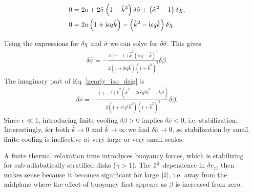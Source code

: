 \begin{align}
  0 &= 2a + 2\hat{\sigma}\left(1+\hat{k}^2\right)\delta\hat{\sigma} +
  \left(\hat{\sigma}^2 -1\right)\delta\chi,\notag\\
  0&= 2a\left(1+\mathrm{i}\epsilon q \hat{k}\right) - \left(\hat{k}^2 - \mathrm{i}\epsilon
    q \hat{k}\right)\delta\chi.
\end{align} 

Using the expressions for $\delta\chi$ and $\hat{\sigma}$ we can solve
for $\delta\hat{\sigma}$. This gives 
\begin{align}\label{nearly_iso_dsig}
  \delta \hat{\sigma} =
  -\frac{\ii\left(\gamma-1\right)\hat{k}^2\left(\ii\epsilon
      q - \hat{k}\right)^2}{2\left(1+\ii\epsilon q \hat{k}\right)\left(1+\hat{k}^2\right)^2}\delta\beta.
\end{align}
The imaginary part of Eq. \ref{nearly_iso_dsig} is
\begin{align}
  \delta\hat{\nu} =
  -\frac{\left(\gamma-1\right)\hat{k}^2 \left(\hat{k}^2 -
      2\epsilon^2q^2\hat{k}^2 - \epsilon^2q^2\right)}{2\left(1+\epsilon^2 q^2
      \hat{k}^2\right)\left(1+\hat{k}^2\right)^2}\delta\beta.  
\end{align}
Since $\epsilon \ll 1$, introducing finite cooling $\delta\beta>0$
implies $\delta\hat{\nu} < 0$, i.e. stabilization. Interestingly, for both
$\hat{k}\to0$ and $\hat{k}\to\infty$ we find $\delta\hat{\nu}\to0$, so
stabilization by small finite cooling is ineffective at very large or
very small scales. 


A finite thermal relaxation time introduces buoyancy
forces, which is stabilizing for sub-adiabatically stratified disks
($\gamma > 1$). The $\hat{z}^2$ dependence in $\delta v_{z1}$ then makes
sense because it becomes significant for large $|\hat{z}|$, i.e. away from
the midplane where the effect of buoyancy first appears as $\beta$ is
increased from zero. 

